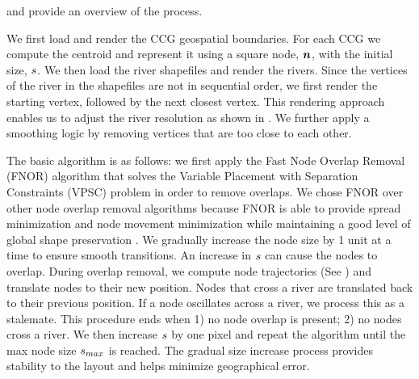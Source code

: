  and  provide an overview of the process.

 We first load and render the CCG geospatial boundaries. For each CCG we compute the centroid and represent it using a square node, $ \bm{n} $, with the initial size, $ s $. We then load the river shapefiles and render the rivers. Since the vertices of the river in the shapefiles are not in sequential order, we first render the starting vertex, followed by the next closest vertex. This rendering approach enables us to adjust the river resolution as shown in . We further apply a smoothing logic by removing vertices that are too close to each other.

 The basic algorithm is as follows: we first apply the Fast Node Overlap Removal (FNOR) algorithm that solves the Variable Placement with Separation Constraints (VPSC) problem \cite{dwyer2006fast} in order to remove overlaps. We chose FNOR over other node overlap removal algorithms because FNOR is able to provide spread minimization and node movement minimization while maintaining a good level of global shape preservation \cite{chen2020Node}. We gradually increase the node size by 1 unit at a time to ensure smooth transitions. An increase in $ s $ can cause the nodes to overlap. During overlap removal, we compute node trajectories (See ) and translate nodes to their new position. Nodes that cross a river are translated back to their previous position. If a node oscillates across a river, we process this as a stalemate. This procedure ends when 1) no node overlap is present; 2) no nodes cross a river. We then increase $ s $ by one pixel and repeat the algorithm until the max node size $ s_{max} $ is reached. The gradual size increase process provides stability to the layout and helps minimize geographical error.


